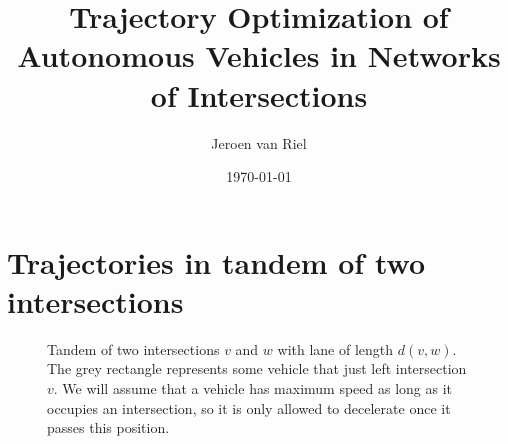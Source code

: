 \documentclass[a4paper]{article}
\author{Jeroen van Riel}
\date{\monthyeardate\today}
\title{Trajectory Optimization of Autonomous Vehicles in Networks of Intersections}
\theoremstyle{definition}
\theoremstyle{plain}
\begin{document}
\maketitle

\tableofcontents

\section{Trajectories in tandem of two intersections}

\begin{figure}
  \centering
  \caption{Tandem of two intersections $v$ and $w$ with lane of length $d(v,w)$.
    The grey rectangle represents some vehicle that just left intersection $v$.
    We will assume that a vehicle has maximum speed as long as it occupies an
    intersection, so it is only allowed to decelerate once it passes this
    position.}
  \label{fig:tandem}
\end{figure}
\end{document}
